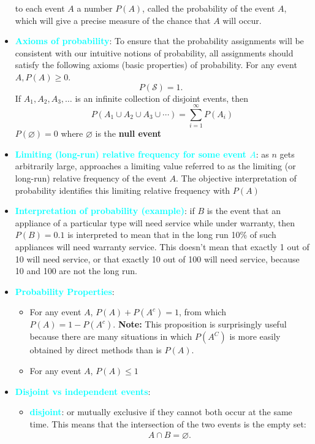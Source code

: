 \documentclass{report}
\begin{document}
\begin{itemize}
to each event $A$ a number $P(A)$, called the probability of the event $A$, which will give
a precise measure of the chance that $A$ will occur. 
        \item \textbf{\textcolor{cyan}{Axioms of probability}}: To ensure that the probability assignments will be consistent with our intuitive notions of probability, all assignments should satisfy the following axioms (basic properties) of probability.
            For any event $A, P(A) \geq 0$.
            $$
            P(\mathcal{S})=1 \text {. }
            $$
            If $A_1, A_2, A_3, \ldots$ is an infinite collection of disjoint events, then
            $$
            P\left(A_1 \cup A_2 \cup A_3 \cup \cdots\right)=\sum_{i=1}^{\infty} P\left(A_i\right)
            $$
            \bigbreak \noindent 
            $P(\varnothing) =0 $ where $\varnothing$ is the \textbf{null event}
        \item \textbf{\textcolor{cyan}{Limiting (long-run) relative frequency for some event $A$}}: as $n$ gets arbitrarily large, approaches a limiting value referred to as the limiting (or long-run) relative frequency of the event $A$. The objective interpretation of probability identifies this limiting relative frequency with $P(A)$
        \item \textbf{\textcolor{cyan}{Interpretation of probability (example)}}: if $B$ is the event that an appliance of a particular type will need service
            while under warranty, then $P(B) = 0.1$ is interpreted to mean that in the long run 10\%
            of such appliances will need warranty service. This doesn’t mean that exactly 1 out
            of 10 will need service, or that exactly 10 out of 100 will need service, because 10
            and 100 are not the long run.
        \item \textbf{\textcolor{cyan}{Probability Properties}}:
            \begin{itemize}
                \item For any event \( A \), \( P(A) + P(A^c) = 1 \), from which \( P(A) = 1 - P(A^c) \).
                    \bigbreak \noindent 
                    \textbf{Note:} This proposition is surprisingly useful because there are many situations in which $P(A^{C})$ is more easily obtained by direct methods than is $P(A)$.
                \item For any event $A$, $P(A) \leq 1 $
            \end{itemize}
        \item \textbf{\textcolor{cyan}{Disjoint vs independent events}}:
            \begin{itemize}
                \item \textbf{\textcolor{cyan}{disjoint}}: or mutually exclusive if they cannot both occur at the same time. This means that the intersection of the two events is the empty set:
                    \begin{align*}
                        A \cap B = \varnothing
                    .\end{align*}


\end{itemize}
\end{itemize}
\end{document}
